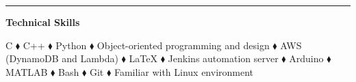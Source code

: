 \documentclass[11pt]{article}
\begin{document}
\rule[10pt]{\textwidth}{.75pt} \vspace{-20pt}
\setlength{\parindent}{0.55em}\par
\textbf{\Large Technical Skills} \vspace{3pt}\setlength{\parindent}{1.5em}\par
\begin{adjustwidth}{1.5em}{}
C $\blacklozenge$ C++ $\blacklozenge$ Python $\blacklozenge$ Object-oriented programming and design $\blacklozenge$ AWS (DynamoDB and Lambda) $\blacklozenge$ \LaTeX\! $\blacklozenge$ Jenkins automation server $\blacklozenge$ Arduino $\blacklozenge$ MATLAB $\blacklozenge$ Bash $\blacklozenge$ Git $\blacklozenge$ Familiar with Linux environment \vspace{8pt}
\end{adjustwidth}
\end{document}
